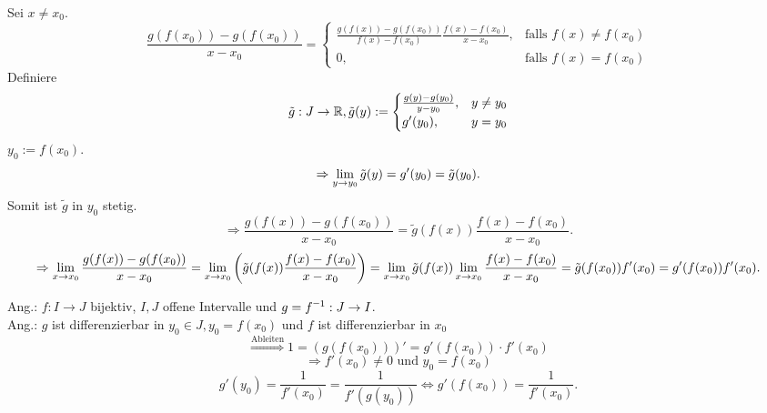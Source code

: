 \documentclass[../ana1.tex]{subfiles}
\begin{document}
\begin{bew}
    Sei \( x \neq x_0 \).
    \[ \frac{ g(f(x_0)) - g(f(x_0)) }{ x - x_0 } = \begin{cases}
        \frac{ g(f(x)) - g(f(x_0)) }{f(x) - f(x_0)} 
        \frac{ f(x) - f(x_0) }{ x-x_0 }, &\text{falls } f(x) \neq f(x_0)\\
        0, &\text{falls } f(x) = f(x_0)
    \end{cases} \]
    Definiere \[ \tilde{g} : J \rightarrow \mathbb{R}, \tilde{g}(y) := \begin{cases}
        \frac{ g(y) - g(y_0) }{ y - y_0 }, &y \neq y_0\\
        g'(y_0), &y=y_0
    \end{cases} \]
    \( y_0 := f(x_0) \).
    \[ \Rightarrow \lim\limits_{y\rightarrow y_0} \tilde{g}(y) = g'(y_0) = \tilde{g}(y_0). \]
    Somit ist \( \tilde{g} \) in \(y_0\) stetig.
    \[ \Rightarrow \frac{ g(f(x)) - g(f(x_0)) }{ x - x_0 } 
    = \tilde{g}(f(x)) \frac{ f(x) - f(x_0) }{x - x_0}. \]
    \[ \Rightarrow \lim\limits_{x\rightarrow x_0} \frac{ g(f(x)) - g(f(x_0)) }{ x - x_0 } 
    = \lim\limits_{x\rightarrow x_0} \left( \tilde{g}(f(x)) \frac{f(x) - f(x_0)}{x - x_0} \right) 
    = \lim\limits_{x\rightarrow x_0} \tilde{g}(f(x)) \lim\limits_{x\rightarrow x_0} \frac{f(x) - f(x_0)}{x - x_0} 
    = \tilde{g}(f(x_0))f'(x_0) = g'(f(x_0)) f'(x_0). \] %
\end{bew}
Ang.: \( f : I \rightarrow J\) bijektiv, \( I, J \) offene Intervalle und 
\( g = \inverse{f} : J \rightarrow I \).\\
Ang.: \( g \) ist differenzierbar in \( y_0 \in J, y_0 = f(x_0) \) und 
\( f \) ist differenzierbar in \(x_0\)
\[ \overset{\text{Ableiten}}{\Rightarrow} 1 = (g(f(x_0)))' 
= g'(f(x_0)) \cdot f'(x_0) \]
\[ \Rightarrow f'(x_0) \neq 0 \text{ und } y_0 = f(x_0) \]
\[ g'(y_0) = \frac{1}{f'(x_0)} = \frac{1}{f'(g(y_0))} 
\Leftrightarrow g'(f(x_0)) = \frac{1}{f'(x_0)}. \] %
\end{document}

